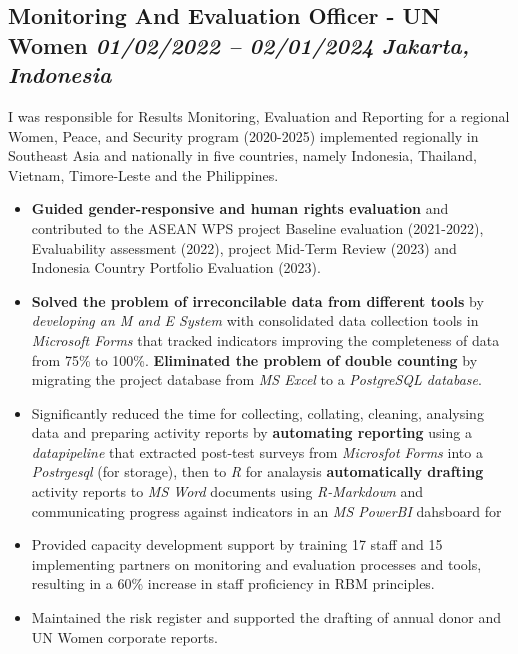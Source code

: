 \documentclass[
  10pt,
]{article}
\providecommand{\tightlist}{%
  \setlength{\itemsep}{0pt}\setlength{\parskip}{0pt}}
\begin{document}
\subsection{\texorpdfstring{Monitoring And Evaluation Officer - UN Women
\emph{01/02/2022 -- 02/01/2024} \textbar{} \emph{Jakarta, Indonesia}}{Monitoring And Evaluation Officer - UN Women 01/02/2022 -- 02/01/2024 \textbar{} Jakarta, Indonesia}}\label{monitoring-and-evaluation-officer---un-women-01022022-02012024-jakarta-indonesia}

I was responsible for Results Monitoring, Evaluation and Reporting for a regional Women, Peace, and Security program (2020-2025) implemented regionally in Southeast Asia and nationally in five countries, namely Indonesia, Thailand, Vietnam, Timore-Leste and the Philippines.

\begin{itemize}
\tightlist
\item
\textbf{Guided gender-responsive and human rights evaluation} and contributed to the ASEAN WPS project Baseline evaluation (2021-2022), Evaluability assessment (2022), project Mid-Term Review (2023) and Indonesia Country Portfolio Evaluation (2023).
\item
\textbf{Solved the problem of irreconcilable data from different tools} by \emph{developing an M and E System} with consolidated data collection tools in \emph{Microsoft Forms} that tracked indicators improving the completeness of data from 75\% to 100\%. \textbf{Eliminated the problem of double counting} by migrating the project database from \emph{MS Excel} to a \emph{PostgreSQL database}.
\item
Significantly reduced the time for collecting, collating, cleaning, analysing data and preparing activity reports by \textbf{automating reporting} using a \emph{datapipeline} that extracted post-test surveys from \emph{Microsfot Forms} into a \emph{Postrgesql} (for storage), then to \emph{R} for analaysis \textbf{automatically drafting} activity reports to \emph{MS Word} documents using \emph{R-Markdown} and communicating progress against indicators in an \emph{MS PowerBI} dahsboard for 
\item
Provided capacity development support by training 17 staff and 15 implementing partners on monitoring and evaluation processes and tools, resulting in a 60\% increase in staff proficiency in RBM principles.
\item
Maintained the risk register and supported the drafting of annual donor and UN Women corporate reports.
\end{itemize}
\end{document}
